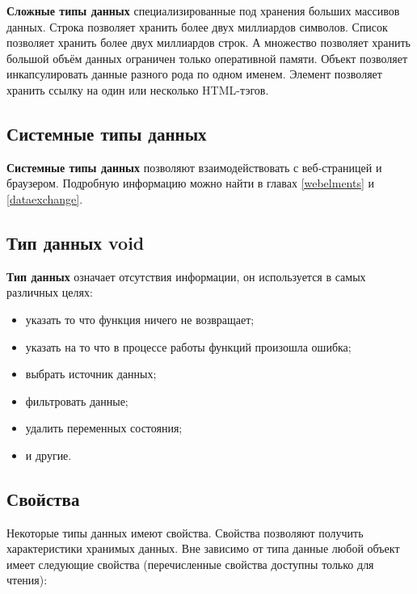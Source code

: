 \documentclass[a4paper, 14pt]{extarticle}
\newenvironment{icItems}
	{ \begin{itemize} [noitemsep,nolistsep] }
	{ \end{itemize} }
\begin{document}
{\bf Сложные типы данных} специализированные под хранения больших массивов данных. Строка позволяет хранить более двух миллиардов символов. Список позволяет хранить более двух миллиардов строк. А множество позволяет хранить большой объём данных ограничен только оперативной памяти. Объект позволяет инкапсулировать данные разного рода по одном именем. Элемент позволяет хранить ссылку на один или несколько HTML-тэгов.

\subsection{Системные типы данных}

{\bf Системные типы данных} позволяют взаимодействовать с веб-страницей и браузером. Подробную информацию можно найти в главах \ref{webelments} и \ref{dataexchange}.

\subsection{Тип данных {\color{lightblue} void}}

{\bf Тип данных \void{}} означает отсутствия информации, он используется в самых различных целях:

\begin{icItems}
\item
	указать то что функция ничего не возвращает;
\item
	указать на то что в процессе работы функций произошла ошибка;
\item
	выбрать источник данных;
\item
	фильтровать данные;
\item
	удалить переменных состояния;
\item
	и другие.
\end{icItems}


\subsection{Свойства}

Некоторые типы данных имеют свойства. Свойства позволяют получить характеристики хранимых данных. Вне зависимо от типа данные любой объект имеет следующие свойства (перечисленные свойства доступны только для чтения):
\end{document}
